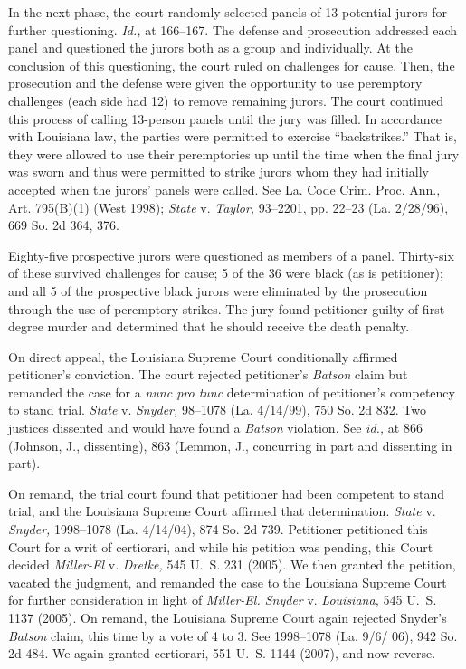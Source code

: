   In the next phase, the court randomly selected panels of 13 potential
jurors for further questioning. \emph{Id.,} at 166--167. The defense
and prosecution addressed each panel and questioned the jurors both as a
group and individually. At the conclusion of this questioning, the court
ruled on challenges for cause. Then, the prosecution and the defense
were given the opportunity to use peremptory challenges (each side had
12) to remove remaining jurors. The court continued this process of
calling 13-person panels until the jury was filled. In accordance with
Louisiana law, the parties were permitted to exercise ``backstrikes.''
That is, they were allowed to use their peremptories up until the time
when the final jury was sworn and thus were permitted to strike jurors
whom they had initially accepted when the jurors' panels were called.
See La. Code Crim. Proc. Ann., Art. 795(B)(1) (West 1998); \emph{State}
v. \emph{Taylor,} 93--2201, pp. 22--23 (La. 2/28/96), 669 So. 2d 364,
376.

  Eighty-five prospective jurors were questioned as members of a panel.
Thirty-six of these survived challenges for \newpage  cause; 5 of the
36 were black (as is petitioner); and all 5 of the prospective black
jurors were eliminated by the prosecution through the use of peremptory
strikes. The jury found petitioner guilty of first-degree murder and
determined that he should receive the death penalty.

  On direct appeal, the Louisiana Supreme Court conditionally affirmed
petitioner's conviction. The court rejected petitioner's \emph{Batson}
claim but remanded the case for a \emph{nunc pro tunc} determination of
petitioner's competency to stand trial. \emph{State} v. \emph{Snyder,}
98--1078 (La. 4/14/99), 750 So. 2d 832. Two justices dissented and
would have found a \emph{Batson} violation. See \emph{id.,} at 866 (Johnson,
J., dissenting), 863 (Lemmon, J., concurring in part and dissenting in
part).

  On remand, the trial court found that petitioner had been competent
to stand trial, and the Louisiana Supreme Court affirmed that
determination. \emph{State} v. \emph{Snyder,} 1998--1078 (La. 4/14/04), 874
So. 2d 739. Petitioner petitioned this Court for a writ of certiorari,
and while his petition was pending, this Court decided \emph{Miller-El}
v. \emph{Dretke,} 545 U.~S. 231 (2005). We then granted the petition,
vacated the judgment, and remanded the case to the Louisiana Supreme
Court for further consideration in light of \emph{Miller-El. Snyder}
v. \emph{Louisiana,} 545 U.~S. 1137 (2005). On remand, the Louisiana
Supreme Court again rejected Snyder's \emph{Batson} claim, this time by
a vote of 4 to 3. See 1998--1078 (La. 9/6/ 06), 942 So. 2d 484. We
again granted certiorari, 551 U.~S. 1144 (2007), and now reverse.

